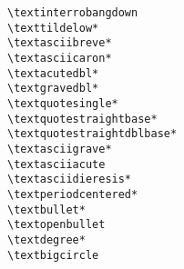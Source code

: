\begin{multicols}{3}
\begin{tabbing}
\textinterrobangdown 	\> \lstinline|\textinterrobangdown|\\
\texttildelow					\> \lstinline|\texttildelow*|\\
\textasciibreve				\> \lstinline|\textasciibreve*|\\
\textasciicaron  			\> \lstinline|\textasciicaron*|\\
\textacutedbl					\> \lstinline|\textacutedbl*|\\
\textgravedbl 				\> \lstinline|\textgravedbl*|\\
\textquotesingle 			\> \lstinline|\textquotesingle*|\\
\textquotestraightbase 		\> \lstinline|\textquotestraightbase*| \\
\textquotestraightdblbase	\> \lstinline|\textquotestraightdblbase*| \\
\textasciigrave	 			\> \lstinline|\textasciigrave*|\\
\textasciiacute				\> \lstinline|\textasciiacute|\\
\textasciidieresis		\> \lstinline|\textasciidieresis*|\\
\textperiodcentered 	\> \lstinline|\textperiodcentered*|\\
\textbullet						\> \lstinline|\textbullet*|\\
\textopenbullet				\> \lstinline|\textopenbullet|\\
\textdegree						\> \lstinline|\textdegree*|\\
\textbigcircle 				\> \lstinline|\textbigcircle|\\
\end{tabbing}
\end{multicols}
	
